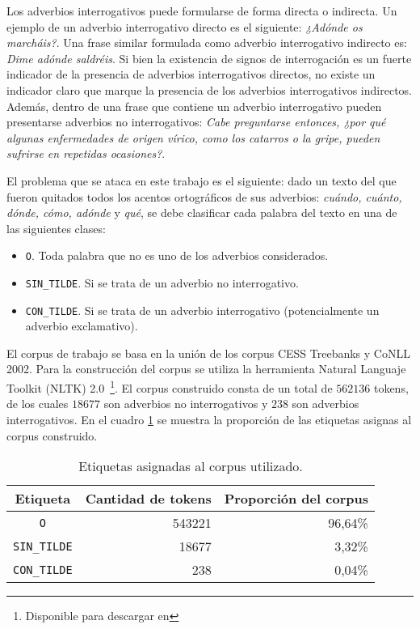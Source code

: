 \documentclass[runningheads,a4paper]{llncs}
\begin{document}
Los adverbios interrogativos puede formularse de forma directa o indirecta\cite{VECIANA04}. Un ejemplo de un adverbio interrogativo directo es el siguiente: \emph{¿Adónde os marcháis?}. Una frase similar formulada como adverbio interrogativo indirecto es: \emph{Dime adónde saldréis}. Si bien la existencia de signos de interrogación es un fuerte indicador de la presencia de adverbios interrogativos directos, no existe un indicador claro que marque la presencia de los adverbios interrogativos indirectos. Además, dentro de una frase que contiene un adverbio interrogativo pueden presentarse adverbios no interrogativos: \emph{Cabe preguntarse entonces, ¿por qué algunas enfermedades de origen vírico, como los catarros o la gripe, pueden sufrirse en repetidas ocasiones?}.

El problema que se ataca en este trabajo es el siguiente: dado un texto del que fueron quitados todos los acentos ortográficos de sus adverbios: \emph{cuándo, cuánto, dónde, cómo, adónde} y \emph{qué}, se debe clasificar cada palabra del texto en una de las siguientes clases: 
\begin{itemize}
	\item {\texttt{O}}. Toda palabra que no es uno de los adverbios considerados.
	\item {\texttt{SIN\_TILDE}}. Si se trata de un adverbio no interrogativo.
	\item {\texttt{CON\_TILDE}}. Si se trata de un adverbio interrogativo (potencialmente un adverbio exclamativo).
\end{itemize}

El corpus de trabajo se basa en la unión de los corpus CESS Treebanks y CoNLL 2002. Para la construcción del corpus se utiliza la herramienta Natural Languaje Toolkit (NLTK) 2.0~\footnote{Disponible para descargar en \nltk}. El corpus construido consta de un total de $562136$ tokens, de los cuales $18677$ son adverbios no interrogativos y $238$ son adverbios interrogativos. En el cuadro \ref{table:corpus} se muestra la proporci\'on de las etiquetas asignas al corpus construido.


\begin{table}[ht]
 	\renewcommand{\arraystretch}{1.3}
	\renewcommand{\tabcolsep}{3pt}
	\caption{Etiquetas asignadas al corpus utilizado.}
	\label{table:corpus}
	\centering
	\begin{tabular}{c r r}
		\hline\hline
		\multicolumn{1}{c}{\textbf{Etiqueta}} & \multicolumn{1}{c}{\textbf{Cantidad de tokens}} & \multicolumn{1}{c}{\textbf{Proporci\'on del corpus}} \\
		\hline
		\texttt{O} & 543221 & 96,64\% \\
		\texttt{SIN\_TILDE} & 18677 & 3,32\% \\
		\texttt{CON\_TILDE} & 238 & 0,04\% \\
		\hline
	\end{tabular}
\end{table}
\end{document}
